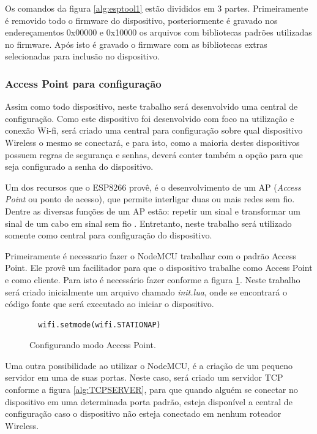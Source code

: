 \documentclass[journal]{IEEEtran}
\begin{document}
Os comandos da figura \ref{alg:esptool1} estão divididos em 3 partes. Primeiramente é removido todo o firmware do dispositivo, posteriormente é gravado nos endereçamentos 0x00000 e 0x10000 os arquivos com bibliotecas padrões utilizadas no firmware. Após isto é gravado o firmware com as bibliotecas extras selecionadas para inclusão no dispositivo.

\subsubsection{Access Point para configuração}

Assim como todo dispositivo, neste trabalho será desenvolvido uma central de configuração. Como este dispositivo foi desenvolvido com foco na utilização e conexão Wi-fi, será criado uma central para configuração sobre qual dispositivo Wireless o mesmo se conectará, e para isto, como a maioria destes dispositivos possuem regras de segurança e senhas, deverá conter também a opção para que seja configurado a senha do dispositivo. 

Um dos recursos que o ESP8266 provê, é o desenvolvimento de um AP (\emph{Access Point} ou ponto de acesso), que permite interligar duas ou mais redes sem fio. Dentre as diversas funções de um AP estão: repetir um sinal e transformar um sinal de um cabo em sinal sem fio \cite{accesspoint}. Entretanto, neste trabalho será utilizado somente como central para configuração do dispositivo.

Primeiramente é necessario fazer o NodeMCU trabalhar com o padrão Access Point. Ele provê um facilitador para que o dispositivo trabalhe como Access Point e como cliente. Para isto é necessário fazer conforme a figura \ref{alg:STATIONAP}. Neste trabalho será criado inicialmente um arquivo chamado \emph{init.lua}, onde se encontrará o código fonte que será executado ao iniciar o dispositivo.

\begin{figure}[h]
\centering

\begin{lstlisting}
  wifi.setmode(wifi.STATIONAP)
\end{lstlisting}

\caption{Configurando modo Access Point.}
\label{alg:STATIONAP}
\end{figure}

Uma outra possibilidade ao utilizar o NodeMCU, é a criação de um pequeno servidor em uma de suas portas. Neste caso, será criado um servidor TCP conforme a figura \ref{alg:TCPSERVER}, para que quando alguém se conectar no dispositivo em uma determinada porta padrão, esteja disponível a central de configuração caso o dispositivo não esteja conectado em nenhum roteador Wireless.
\end{document}
